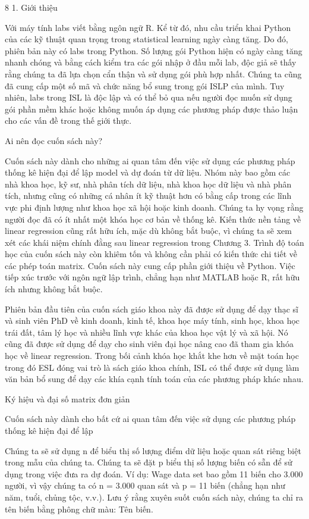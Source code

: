 8 1. Giới thiệu

Với máy tính labs viết bằng ngôn ngữ R. Kể từ đó, nhu cầu triển khai Python của các kỹ thuật quan trọng trong statistical learning ngày càng tăng. Do đó, phiên bản này có labs trong Python. Số lượng gói Python hiện có ngày càng tăng nhanh chóng và bằng cách kiểm tra các gói nhập ở đầu mỗi lab, độc giả sẽ thấy rằng chúng ta đã lựa chọn cẩn thận và sử dụng gói phù hợp nhất. Chúng ta cũng đã cung cấp một số mã và chức năng bổ sung trong gói ISLP của mình. Tuy nhiên, labs trong ISL là độc lập và có thể bỏ qua nếu người đọc muốn sử dụng gói phần mềm khác hoặc không muốn áp dụng các phương pháp được thảo luận cho các vấn đề trong thế giới thực.

Ai nên đọc cuốn sách này?

Cuốn sách này dành cho những ai quan tâm đến việc sử dụng các phương pháp thống kê hiện đại để lập model và dự đoán từ dữ liệu. Nhóm này bao gồm các nhà khoa học, kỹ sư, nhà phân tích dữ liệu, nhà khoa học dữ liệu và nhà phân tích, nhưng cũng có những cá nhân ít kỹ thuật hơn có bằng cấp trong các lĩnh vực phi định lượng như khoa học xã hội hoặc kinh doanh. Chúng ta hy vọng rằng người đọc đã có ít nhất một khóa học cơ bản về thống kê. Kiến thức nền tảng về linear regression cũng rất hữu ích, mặc dù không bắt buộc, vì chúng ta sẽ xem xét các khái niệm chính đằng sau linear regression trong Chương 3. Trình độ toán học của cuốn sách này còn khiêm tốn và không cần phải có kiến ​​thức chi tiết về các phép toán matrix. Cuốn sách này cung cấp phần giới thiệu về Python. Việc tiếp xúc trước với ngôn ngữ lập trình, chẳng hạn như MATLAB hoặc R, rất hữu ích nhưng không bắt buộc.

Phiên bản đầu tiên của cuốn sách giáo khoa này đã được sử dụng để dạy thạc sĩ và sinh viên PhD về kinh doanh, kinh tế, khoa học máy tính, sinh học, khoa học trái đất, tâm lý học và nhiều lĩnh vực khác của khoa học vật lý và xã hội. Nó cũng đã được sử dụng để dạy cho sinh viên đại học nâng cao đã tham gia khóa học về linear regression. Trong bối cảnh khóa học khắt khe hơn về mặt toán học trong đó ESL đóng vai trò là sách giáo khoa chính, ISL có thể được sử dụng làm văn bản bổ sung để dạy các khía cạnh tính toán của các phương pháp khác nhau.

Ký hiệu và đại số matrix đơn giản

Cuốn sách này dành cho bất cứ ai quan tâm đến việc sử dụng các phương pháp thống kê hiện đại để lập

Chúng ta sẽ sử dụng n để biểu thị số lượng điểm dữ liệu hoặc quan sát riêng biệt trong mẫu của chúng ta. Chúng ta sẽ đặt p biểu thị số lượng biến có sẵn để sử dụng trong việc đưa ra dự đoán. Ví dụ: Wage data set bao gồm 11 biến cho 3.000 người, vì vậy chúng ta có n = 3.000 quan sát và p = 11 biến (chẳng hạn như năm, tuổi, chủng tộc, v.v.). Lưu ý rằng xuyên suốt cuốn sách này, chúng ta chỉ ra tên biến bằng phông chữ màu: Tên biến.

